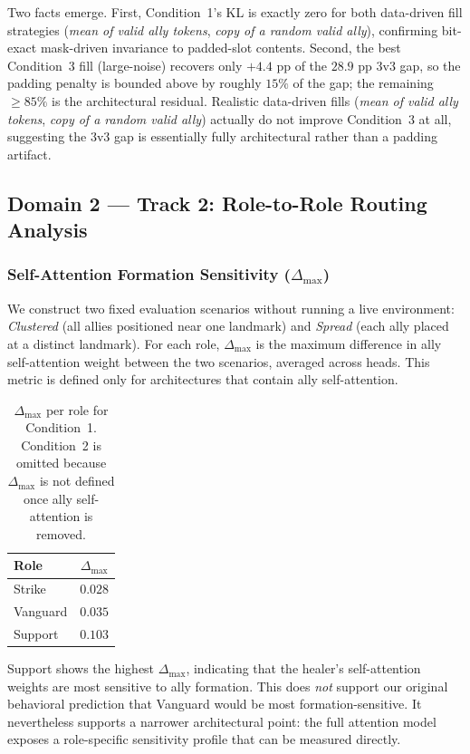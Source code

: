 Two facts emerge. First, Condition~1's KL is exactly zero for both data-driven fill strategies (\textit{mean of valid ally tokens}, \textit{copy of a random valid ally}), confirming bit-exact mask-driven invariance to padded-slot contents. Second, the best Condition~3 fill (large-noise) recovers only $+4.4$ pp of the $28.9$ pp 3v3 gap, so the padding penalty is bounded above by roughly $15\%$ of the gap; the remaining $\geq 85\%$ is the architectural residual. Realistic data-driven fills (\textit{mean of valid ally tokens}, \textit{copy of a random valid ally}) actually do not improve Condition~3 at all, suggesting the 3v3 gap is essentially fully architectural rather than a padding artifact.

\subsection{Domain 2 --- Track 2: Role-to-Role Routing Analysis}

\subsubsection{Self-Attention Formation Sensitivity ($\Delta_{\max}$)}

We construct two fixed evaluation scenarios without running a live environment: \textit{Clustered} (all allies positioned near one landmark) and \textit{Spread} (each ally placed at a distinct landmark). For each role, $\Delta_{\max}$ is the maximum difference in ally self-attention weight between the two scenarios, averaged across heads. This metric is defined only for architectures that contain ally self-attention.

\begin{table}[h]
\centering
\caption{$\Delta_{\max}$ per role for Condition~1. Condition~2 is omitted because $\Delta_{\max}$ is not defined once ally self-attention is removed.}
\label{tab:delta_max}
\begin{tabular}{lc}
\toprule
Role & $\Delta_{\max}$ \\
\midrule
Strike & $0.028$ \\
Vanguard & $0.035$ \\
Support & $\mathbf{0.103}$ \\
\bottomrule
\end{tabular}
\end{table}

Support shows the highest $\Delta_{\max}$, indicating that the healer's self-attention weights are most sensitive to ally formation. This does \emph{not} support our original behavioral prediction that Vanguard would be most formation-sensitive. It nevertheless supports a narrower architectural point: the full attention model exposes a role-specific sensitivity profile that can be measured directly.


